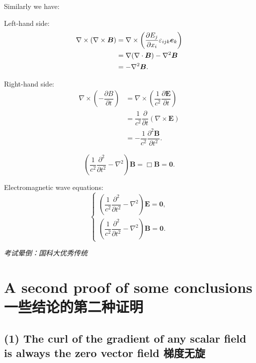 Similarly we have:

Left-hand side: \begin{align*}
    \nabla \times (\nabla \times \boldsymbol B) & = \nabla \times \left({\partial E_j \over \partial x_i} \varepsilon_{ijk} \boldsymbol e_k \right) \\
    & = \nabla (\nabla \cdot  \boldsymbol B) - \nabla^2 \boldsymbol B \\
    & = - \nabla^2 \boldsymbol B.
\end{align*}

Right-hand side: \begin{align*}
    \nabla \times \left(-\dfrac{\partial B}{\partial t} \right) & = \nabla \times \left(\dfrac{1}{c^2} \dfrac{\partial \boldsymbol E}{\partial t}\right) \\
    & = \dfrac{1}{c^2} \dfrac{\partial}{\partial t} (\nabla \times \boldsymbol E) \\
    & = - \dfrac{1}{c^2} \dfrac{\partial^2 \boldsymbol B}{\partial t^2}.
\end{align*}

\[\left(\dfrac{1}{c^2} \dfrac{\partial^2}{\partial t^2}- \nabla^2 \right) \boldsymbol B = \Box \boldsymbol B = \boldsymbol 0.\]

Electromagnetic wave equations: \[\left\{
    \begin{aligned}
        \left(\dfrac{1}{c^2} \dfrac{\partial^2}{\partial t^2}- \nabla^2 \right) \boldsymbol E = \boldsymbol 0, \\
        \left(\dfrac{1}{c^2} \dfrac{\partial^2}{\partial t^2}- \nabla^2 \right) \boldsymbol B = \boldsymbol 0.
    \end{aligned}
\right.\]

\emph{考试晕倒：国科大优秀传统}

\section{A second proof of some conclusions
一些结论的第二种证明}\label{a-second-proof-of-some-conclusions-ux4e00ux4e9bux7ed3ux8bbaux7684ux7b2cux4e8cux79cdux8bc1ux660e}

\subsection*{(1) The curl of the gradient of any scalar field is
always the zero vector field
梯度无旋}\label{the-curl-of-the-gradient-of-any-scalar-field-is-always-the-zero-vector-field-ux68afux5ea6ux65e0ux65cb}

